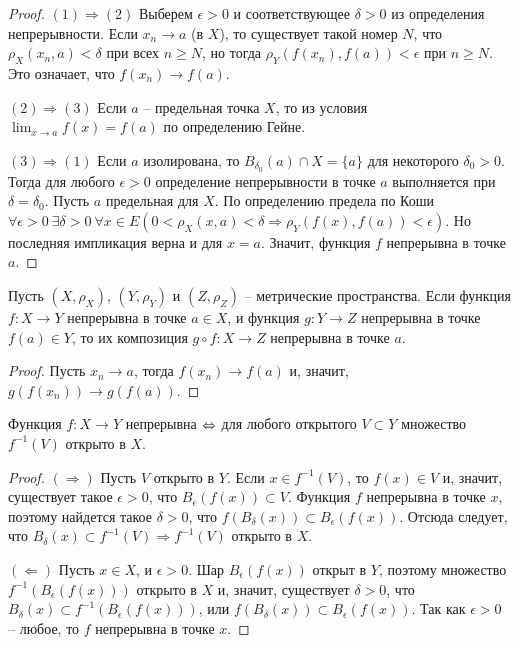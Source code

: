 \begin{proof}
    $(1) \Rightarrow (2)$ Выберем $\epsilon > 0$ и соответствующее $\delta > 0$ из определения непрерывности. Если $x_{n} \to a$ (в $X$), то существует такой номер $N$, что $\rho_{X}(x_{n}, a) < \delta$ при всех $n \geq N$, но тогда $\rho_{Y}(f(x_{n}), f(a)) < \epsilon$ при $n \geq N$. Это означает, что $f(x_{n}) \to f(a)$.

    $(2) \Rightarrow (3)$ Если $a$ -- предельная точка $X$, то из условия $\lim_{x \to a} f(x) = f(a)$ по определению Гейне.

    $(3) \Rightarrow (1)$ Если $a$ изолирована, то $B_{\delta_{0}}(a) \cap X = \{a\}$ для некоторого $\delta_{0} > 0$. Тогда для любого $\epsilon > 0$ определение непрерывности в точке $a$ выполняется при $\delta = \delta_{0}$. Пусть $a$ предельная для $X$. По определению предела по Коши $\forall \epsilon > 0 \ \exists \delta > 0 \ \forall x \in E \left(0 < \rho_{X}(x, a) < \delta \Rightarrow \rho_{Y}(f(x), f(a)) < \epsilon\right)$. Но последняя импликация верна и для $x = a$. Значит, функция $f$ непрерывна в точке $a$.
\end{proof}

\begin{theorem}
    Пусть $(X, \rho_{X})$, $(Y, \rho_{Y})$ и $(Z, \rho_{Z})$ -- метрические пространства. Если функция $f: X \to Y$ непрерывна в точке $a \in X$, и функция $g: Y \to Z$ непрерывна в точке $f(a) \in Y$, то их композиция $g \circ f: X \to Z$ непрерывна в точке $a$.
\end{theorem}

\begin{proof}
    Пусть $x_{n} \to a$, тогда $f(x_{n}) \to f(a)$ и, значит, $g(f(x_{n})) \to g(f(a))$.
\end{proof}

\begin{theorem}
    Функция $f: X \to Y$ непрерывна $\Leftrightarrow$ для любого открытого $V \subset Y$ множество $f^{-1}(V)$ открыто в $X$.
\end{theorem}

\begin{proof}
    $(\Rightarrow)$ Пусть $V$ открыто в $Y$. Если $x \in f^{-1}(V)$, то $f(x) \in V$ и, значит, существует такое $\epsilon > 0$, что $B_{\epsilon}(f(x)) \subset V$. Функция $f$ непрерывна в точке $x$, поэтому найдется такое $\delta > 0$, что $f(B_{\delta}(x)) \subset B_{\epsilon}(f(x))$. Отсюда следует, что $B_{\delta}(x) \subset f^{-1}(V) \Rightarrow f^{-1}(V)$ открыто в $X$.

    $(\Leftarrow)$ Пусть $x \in X$, и $\epsilon > 0$. Шар $B_{\epsilon}(f(x))$ открыт в $Y$, поэтому множество $f^{-1}(B_{\epsilon}(f(x)))$ открыто в $X$ и, значит, существует $\delta > 0$, что $B_{\delta}(x) \subset f^{-1}(B_{\epsilon}(f(x)))$, или $f(B_{\delta}(x)) \subset B_{\epsilon}(f(x))$. Так как $\epsilon > 0$ -- любое, то $f$ непрерывна в точке $x$.
\end{proof}

